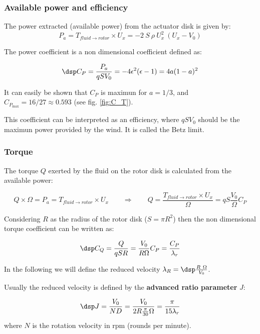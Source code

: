 \subsubsection{\sc Available power and efficiency}

The power extracted (available power) from the actuator disk is given by:
$$
P_a = T_{fluid\to rotor} \times U_x  = -2~S~\rho~U_x^2~(U_x-V_0) 
$$

The power coefficient is a non dimensional coefficient defined as:

\begin{equation} \dsp 
  C_P = \frac{P_a}{q S V_0} = - 4 \epsilon^2 (\epsilon -1) = 4 a (1- a)^2
  \label{eq:Pa_0}
\end{equation}

It can easily be shown that $C_P$ is maximun for $a=1/3$, and $C_{P_{\max}} = 16/27\approx 0.593$ (see fig. \ref{fig:C_T}).

This coefficient can be interpreted as an efficiency, where $q S V_0$ should be the maximun
power provided by the wind. It is called the Betz limit. 


\subsubsection{\sc Torque }

The torque $Q$ exerted by the fluid on the rotor disk is calculated from the available power:

$$ 
Q \times \Omega = P_a = T_{fluid\to rotor} \times U_x \qquad  \Longrightarrow \qquad
Q =  \frac{T_{fluid\to rotor} \times U_x}{\Omega} = q S \frac{V_0}{\Omega} C_P
$$

Considering $R$ as the radius of the rotor disk ($S = \pi R^2$) then the non dimensional torque coefficient can
be written as:

$$\dsp
C_Q = \frac{Q}{q S R} = \frac{V_0}{R \Omega} C_P = \frac{C_P}{\lambda_r}
$$

In the following we will define the reduced velocity $\lambda_R = \dsp \frac{R~\Omega}{V_0}$.

Usually the reduced velocity is defined by the \textbf{advanced ratio parameter} $J$:

$$\dsp J = \frac{V_0}{N D} = \frac{V_0}{2 R \frac{\pi}{30} \Omega} = \dfrac{\pi}{15 \lambda_r} $$
where $N$ is the rotation velocity in rpm (rounds per minute).


